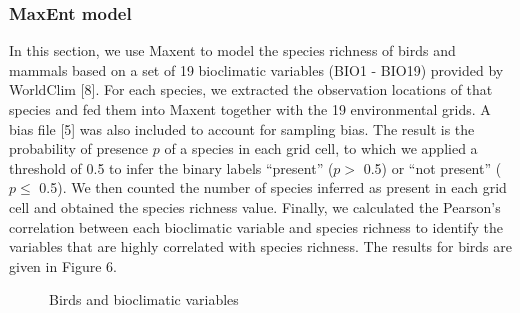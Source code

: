 \documentclass{article}
\begin{document}
\subsubsection{MaxEnt model}
In this section, we use Maxent to model the species richness of birds and mammals based on a set of 19 bioclimatic variables (BIO1 - BIO19) provided by WorldClim [8]. For each species, we extracted the observation locations of that species and fed them into Maxent together with the 19 environmental grids. A bias file [5] was also included to account for sampling bias. The result is the probability of presence $p$ of a species in each grid cell, to which we applied a threshold of 0.5 to infer the binary labels “present” ($p >$ 0.5) or “not present” ($p \leq$ 0.5). We then counted the number of species inferred as present in each grid cell and obtained the species richness value. Finally, we calculated the Pearson’s correlation between each bioclimatic variable and species richness to identify the variables that are highly correlated with species richness. The results for birds are given in Figure 6.
\par
\begin{figure}[h]
	\vspace*{-3mm}
	\centering
	\vspace*{-2mm}
	\caption{Birds and bioclimatic variables}
\end{figure}
\end{document}

